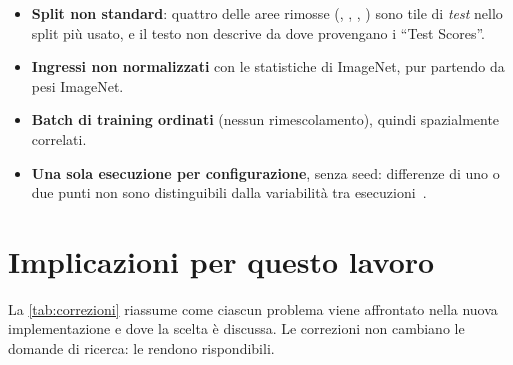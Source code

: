 \begin{itemize}
  \item \textbf{Split non standard}: quattro delle aree rimosse (, ,
  , ) sono tile di \emph{test} nello split più usato, e il testo non
  descrive da dove provengano i \enquote{Test Scores}.
  \item \textbf{Ingressi non normalizzati} con le statistiche di ImageNet, pur partendo da
  pesi ImageNet.
  \item \textbf{Batch di training ordinati} (nessun rimescolamento), quindi spazialmente
  correlati.
  \item \textbf{Una sola esecuzione per configurazione}, senza seed: differenze di uno o due
  punti non sono distinguibili dalla variabilità tra esecuzioni~\cite{bouthillier2021variance}.
\end{itemize}

\section{Implicazioni per questo lavoro}
\label{sec:implicazioni}

La \cref{tab:correzioni} riassume come ciascun problema viene affrontato nella nuova
implementazione e dove la scelta è discussa. Le correzioni non cambiano le domande di ricerca:
le rendono rispondibili.

